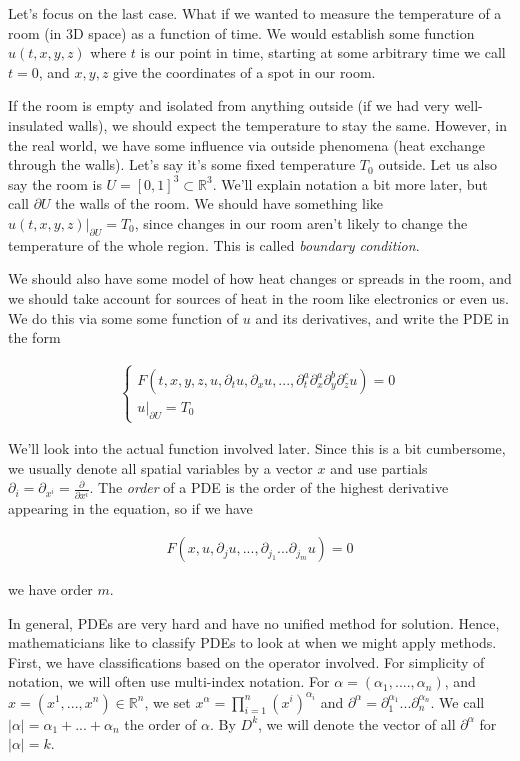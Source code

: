 \documentclass{article}
\newcommand{\R}{{\mathbb{R}}}
\newcommand{\pd}{\partial}
\begin{document}
	Let's focus on the last case. What if we wanted to measure the temperature of a room (in 3D space) as a function of time. We would establish some function $u(t,x,y,z)$ where $t$ is our point in time, starting at some arbitrary time we call $t=0$, and $x,y,z$ give the coordinates of a spot in our room. 
	
	If the room is empty and isolated from anything outside (if we had very well-insulated walls), we should expect the temperature to stay the same. However, in the real world, we have some influence via outside phenomena (heat exchange through the walls). Let's say it's some fixed temperature $T_0$ outside. Let us also say the room is $U = [0,1]^{3} \subset \R^{3}$. We'll explain notation a bit more later, but call $\pd U$ the walls of the room. We should have something like $u(t,x,y,z)|_{\pd U} = T_0$, since changes in our room aren't likely to change the temperature of the whole region. This is called \textit{boundary condition}. 
	
	We should also have some model of how heat changes or spreads in the room, and we should take account for sources of heat in the room like electronics or even us. We do this via some some function of $u$ and its derivatives, and write the PDE in the form
	
	\begin{align*}
		\begin{cases}
			F(t,x,y,z,u, \pd_{t} u, \pd_{x}u, ... , \pd_{t}^{a}\pd_{x}^{a}\pd_{y}^{b}\pd_{z}^{c}u) = 0 \\
			u |_{\pd U} = T_0
		\end{cases}
	\end{align*}
	
	We'll look into the actual function involved later. Since this is a bit cumbersome, we usually denote all spatial variables by a vector $x$ and use partials $\pd_{i} = \pd_{x^i} = \frac{\pd}{\pd x^i}$. The \textit{order} of a PDE is the order of the highest derivative appearing in the equation, so if we have 
	
	\begin{align*}
		F(x,u,\pd_{j}u,...,\pd_{j_1}...\pd_{j_m} u) = 0
	\end{align*}
	
	we have order $m$. 
	
	
	In general, PDEs are very hard and have no unified method for solution. Hence, mathematicians like to classify PDEs to look at when we might apply methods. First, we have classifications based on the operator involved. For simplicity of notation, we will often use multi-index notation. For $\alpha = (\alpha_1,....,\alpha_n)$, and $x = (x^1,...,x^n) \in \R^{n}$, we set $x^{\alpha} = \prod_{i=1}^{n} (x^i)^{\alpha_i}$ and $\pd^{\alpha} = \pd_{1}^{\alpha_1}...\pd_{n}^{\alpha_n}$. We call $|\alpha| = \alpha_1 + ... + \alpha_n$ the order of $\alpha$. By $D^{k}$, we will denote the vector of all $\pd^{\alpha}$ for $|\alpha| = k$. 
	
\end{document}
